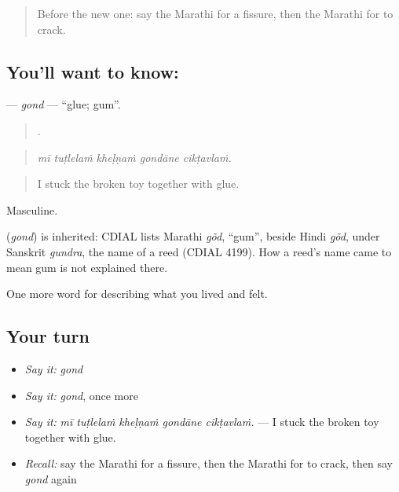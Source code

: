 \label{lesson:MR-C521-gond}



\begin{quote}
Before the new one: say the Marathi for a fissure, then the Marathi for to crack.
\end{quote}

\subsection*{You'll want to know: }
\textbf{} — \emph{gond} — \textquotedblleft{}glue; gum\textquotedblright{}.

\begin{quote}
    .
\end{quote}

\begin{quote}
\emph{mī tuṭlelaṁ kheḷṇaṁ gondāne cikṭavlaṁ.}
\end{quote}

\begin{quote}
I stuck the broken toy together with glue.
\end{quote}

Masculine.

\begin{cousinweb}
\textbf{} (\emph{gond}) is inherited: CDIAL lists Marathi \emph{gõd}, \textquotedblleft{}gum\textquotedblright{}, beside Hindi \emph{gõd}, under Sanskrit \emph{gundra}, the name of a reed (CDIAL 4199). How a reed's name came to mean gum is not explained there.
\end{cousinweb}

\begin{grammarlens}[title={What you've built}]
One more word for describing what you lived and felt.
\end{grammarlens}

\subsection*{Your turn}
\begin{itemize}
\raggedright
  \item \emph{Say it:} \emph{gond}
  \item \emph{Say it:} \emph{gond}, once more
  \item \emph{Say it:} \emph{mī tuṭlelaṁ kheḷṇaṁ gondāne cikṭavlaṁ.} — I stuck the broken toy together with glue.
  \item \emph{Recall:} say the Marathi for a fissure, then the Marathi for to crack, then say \emph{gond} again
\end{itemize}

